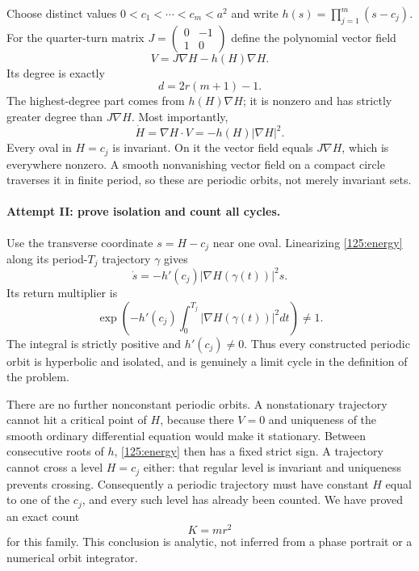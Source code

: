 \documentclass[11pt,a4paper]{article}
\numberwithin{equation}{section}
\begin{document}
Choose distinct values $0<c_1<\cdots<c_m<a^2$ and write
$h(s)=\prod_{j=1}^m(s-c_j)$.  For the quarter-turn matrix
$J=\begin{pmatrix}0&-1\\1&0\end{pmatrix}$ define the polynomial vector
field
\begin{equation}\label{125:field}
 V=J\nabla H-h(H)\nabla H.
\end{equation}
Its degree is exactly
\begin{equation}\label{125:degree}
 d=2r(m+1)-1.
\end{equation}
The highest-degree part comes from $h(H)\nabla H$; it is nonzero and
has strictly greater degree than $J\nabla H$.
Most importantly,
\begin{equation}\label{125:energy}
 \dot H=\nabla H\cdot V=-h(H)|\nabla H|^2.
\end{equation}
Every oval in $H=c_j$ is invariant.  On it the vector field equals
$J\nabla H$, which is everywhere nonzero.  A smooth nonvanishing
vector field on a compact circle traverses it in finite period,
so these are periodic orbits, not merely invariant sets.

\paragraph{Attempt II: prove isolation and count all cycles.}
Use the transverse coordinate $s=H-c_j$ near one oval.  Linearizing
\eqref{125:energy} along its period-$T_j$ trajectory $\gamma$ gives
\[
 \dot s=-h'(c_j)|\nabla H(\gamma(t))|^2s.
\]
Its return multiplier is
\begin{equation}\label{125:multiplier}
 \exp\!\left(-h'(c_j)\int_0^{T_j}
                      |\nabla H(\gamma(t))|^2dt\right)\ne1.
\end{equation}
The integral is strictly positive and $h'(c_j)\ne0$.  Thus every
constructed periodic orbit is hyperbolic and isolated, and is genuinely
a limit cycle in the definition of the problem.

There are no further nonconstant periodic orbits.  A nonstationary
trajectory cannot hit a critical point of $H$, because there $V=0$
and uniqueness of the smooth ordinary differential equation would make
it stationary.  Between consecutive roots of $h$, \eqref{125:energy}
then has a fixed strict sign.  A trajectory cannot cross a level
$H=c_j$ either: that regular level is invariant and uniqueness prevents
crossing.  Consequently a periodic trajectory must have constant $H$
equal to one of the $c_j$, and every such level has already been counted.
We have proved an exact count
\begin{equation}\label{125:count}
 K=mr^2
\end{equation}
for this family.  This conclusion is analytic, not inferred from a phase
portrait or a numerical orbit integrator.
\end{document}
